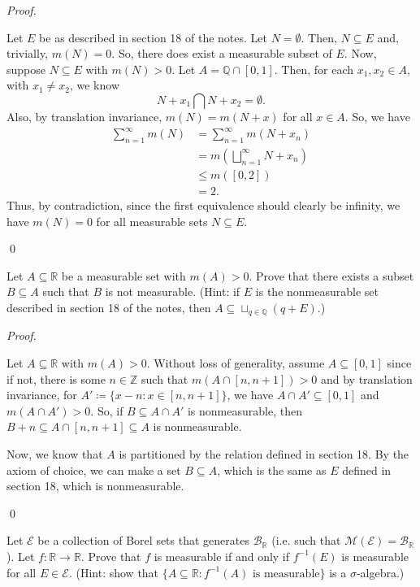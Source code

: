 \documentclass[12pt]{article}
\newenvironment{problem}[2][Problem]{\begin{trivlist}
\item[\hskip \labelsep {\bfseries #1}\hskip \labelsep {\bfseries
#2.}]}{\end{trivlist}}
\newenvironment{sol}
    {\emph{Proof.}
    }
    {
    \qed
    }
\begin{document}
    \begin{sol}
      Let $E$ be as described in section 18 of the notes. Let $N = \emptyset$. Then, $N \subseteq E$ and, trivially, $m(N) = 0$. So, there does exist a measurable subset of $E$. Now, suppose $N \subseteq E$ with $m(N) > 0$. Let $A = \mathbb{Q} \cap [0,1]$. Then, for each $x_1,x_2 \in A$, with $x_1 \neq x_2$, we know $$N + x_1 \bigcap N + x_2 = \emptyset.$$ Also, by translation invariance, $m(N) = m(N+x)$ for all $x \in A$. So, we have 
      \begin{align*}
        \sum_{n = 1}^{\infty} m(N) &= \sum_{n = 1}^{\infty} m(N + x_n) \tag*{(Each $x_n \in A$)} \\
        &= m\left( \bigsqcup_{n = 1}^{\infty} N+x_n \right) \\
        &\leq m([0,2]) \\ &= 2.
      \end{align*}
      Thus, by contradiction, since the first equivalence should clearly be infinity, we have $m(N) = 0$ for all measurable sets $N \subseteq E$.
    \end{sol}
    
    \begin{problem}{42}
    Let $A \subseteq \mathbb{R}$ be a measurable set with $m(A) > 0$. Prove that there exists a subset $B \subseteq A$ such that $B$ is not measurable. (Hint: if $E$ is the nonmeasurable set described in section 18 of the notes, then $A \subseteq \sqcup_{q \in \mathbb{Q}}(q+E)$.)
    \end{problem}
    
    \begin{sol}
      Let $A \subseteq \mathbb{R}$ with $m(A) > 0$. Without loss of generality, assume $A \subseteq [0,1]$ since if not, there is some $n \in \mathbb{Z}$ such that $m(A \cap [n,n+1]) > 0$ and by translation invariance, for $A' \coloneqq \{x-n : x \in [n,n+1]\}$, we have $A \cap A' \subseteq [0,1]$ and $m(A \cap A') > 0$. So, if $B \subseteq A \cap A'$ is nonmeasurable, then $B + n \subseteq A \cap [n,n+1] \subseteq A$ is nonmeasurable.
    
      Now, we know that $A$ is partitioned by the relation defined in section 18. By the axiom of choice, we can make a set $B \subseteq A$, which is the same as $E$ defined in section 18, which is nonmeasurable.
    \end{sol}
    
    \begin{problem}{43}
    Let $\mathcal{E}$ be a collection of Borel sets that generates $\mathcal{B}_{\mathbb{R}}$ (i.e. such that $\mathcal{M}(\mathcal{E}) = \mathcal{B}_{\mathbb{R}}$). Let $f : \mathbb{R} \to \mathbb{R}$. Prove that $f$ is measurable if and only if $f^{-1}(E)$ is measurable for all $E \in \mathcal{E}$. (Hint: show that $\{A \subseteq \mathbb{R} : f^{-1}(A)\text{ is measurable}\}$ is a $\sigma$-algebra.)
    \end{problem}
    
\end{document}
